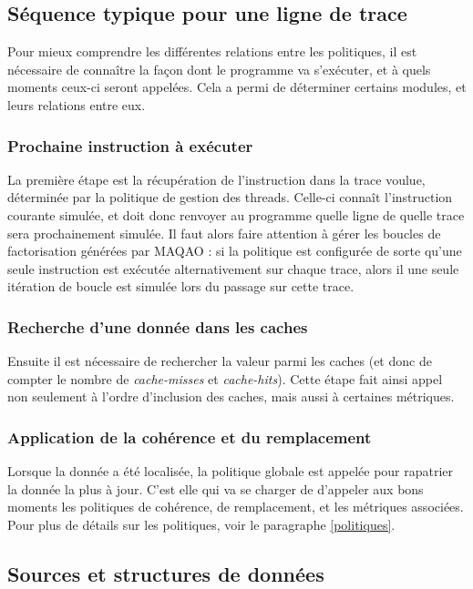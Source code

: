 \subsection{Séquence typique pour une ligne de trace}

Pour mieux comprendre les différentes relations entre les politiques, il est nécessaire de connaître la façon dont le programme va s'exécuter, et à quels moments ceux-ci seront appelées. Cela a permi de déterminer certains modules, et leurs relations entre eux. 

\subsubsection{Prochaine instruction à exécuter}

La première étape est la récupération de l'instruction dans la trace voulue, déterminée par la politique de gestion des threads. Celle-ci connaît l'instruction courante simulée, et doit donc renvoyer au programme quelle ligne de quelle trace sera prochainement simulée. Il faut alors faire attention à gérer les boucles de factorisation générées par \textsc{MAQAO} : si la politique est configurée de sorte qu'une seule instruction est exécutée alternativement sur chaque trace, alors il une seule itération de boucle est simulée lors du passage sur cette trace. 

\subsubsection{Recherche d'une donnée dans les caches}

Ensuite il est nécessaire de rechercher la valeur parmi les caches (et donc de compter le nombre de \emph{cache-misses} et \emph{cache-hits}). Cette étape fait ainsi appel non seulement à l'ordre d'inclusion des caches, mais aussi à certaines métriques.

\subsubsection{Application de la cohérence et du remplacement}

 Lorsque la donnée a été localisée, la politique globale est appelée pour rapatrier la donnée la plus à jour. C'est elle qui va se charger de d'appeler aux bons moments les politiques de cohérence, de remplacement, et les métriques associées. Pour plus de détails sur les politiques, voir le paragraphe \ref{politiques}.

\subsection{Sources et structures de données}

